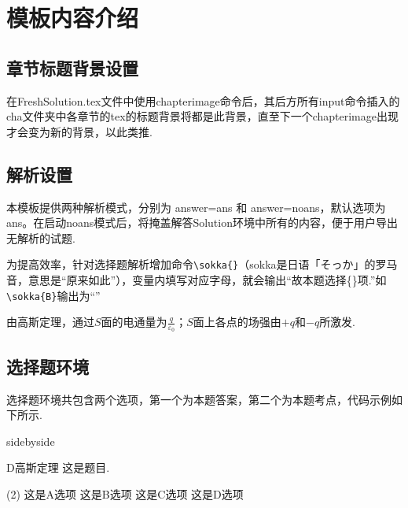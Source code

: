 {\section{模板内容介绍}
\subsection{章节标题背景设置}
在FreshSolution.tex文件中使用chapterimage命令后，其后方所有input命令插入的cha文件夹中各章节的tex的标题背景将都是此背景，直至下一个chapterimage出现才会变为新的背景，以此类推.

\subsection{解析设置}
本模板提供两种解析模式，分别为 answer=ans 和 answer=noans，默认选项为ans。在启动noans模式后，将掩盖解答Solution环境中所有的内容，便于用户导出无解析的试题.

为提高效率，针对选择题解析增加命令\verb|\sokka{}|（sokka是日语「そっか」的罗马音，意思是“原来如此”），变量内填写对应字母，就会输出“故本题选择\{\}项.”如\verb|\sokka{B}|输出为“”
\begin{tcblisting}{}
\begin{solution}
由高斯定理，通过$S$面的电通量为$\frac{q}{\varepsilon_0}$；$S$面上各点的场强由$+q$和$-q$所激发.
\end{solution}
\end{tcblisting}
\subsection{选择题环境}
选择题环境共包含两个选项，第一个为本题答案，第二个为本题考点，代码示例如下所示.
\begin{tcblisting}{sidebyside}
    \begin{choice}{D}{高斯定理}
        这是题目.
        \begin{tasks}(2)%
            \task 这是A选项
            \task 这是B选项
            \task 这是C选项
            \task 这是D选项
        \end{tasks}
    \end{choice}
\end{tcblisting}

}
